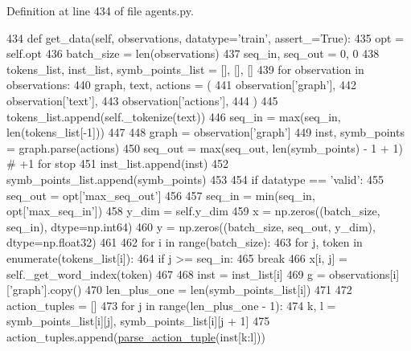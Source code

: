 Definition at line 434 of file agents.\+py.


\begin{DoxyCode}
434     \textcolor{keyword}{def }get\_data(self, observations, datatype='train', assert\_=True):
435         opt = self.opt
436         batch\_size = len(observations)
437         seq\_in, seq\_out = 0, 0
438         tokens\_list, inst\_list, symb\_points\_list = [], [], []
439         \textcolor{keywordflow}{for} observation \textcolor{keywordflow}{in} observations:
440             graph, text, actions = (
441                 observation[\textcolor{stringliteral}{'graph'}],
442                 observation[\textcolor{stringliteral}{'text'}],
443                 observation[\textcolor{stringliteral}{'actions'}],
444             )
445             tokens\_list.append(self.\_tokenize(text))
446             seq\_in = max(seq\_in, len(tokens\_list[-1]))
447 
448             graph = observation[\textcolor{stringliteral}{'graph'}]
449             inst, symb\_points = graph.parse(actions)
450             seq\_out = max(seq\_out, len(symb\_points) - 1 + 1)  \textcolor{comment}{# +1 for stop}
451             inst\_list.append(inst)
452             symb\_points\_list.append(symb\_points)
453 
454         \textcolor{keywordflow}{if} datatype == \textcolor{stringliteral}{'valid'}:
455             seq\_out = opt[\textcolor{stringliteral}{'max\_seq\_out'}]
456 
457         seq\_in = min(seq\_in, opt[\textcolor{stringliteral}{'max\_seq\_in'}])
458         y\_dim = self.y\_dim
459         x = np.zeros((batch\_size, seq\_in), dtype=np.int64)
460         y = np.zeros((batch\_size, seq\_out, y\_dim), dtype=np.float32)
461 
462         \textcolor{keywordflow}{for} i \textcolor{keywordflow}{in} range(batch\_size):
463             \textcolor{keywordflow}{for} j, token \textcolor{keywordflow}{in} enumerate(tokens\_list[i]):
464                 \textcolor{keywordflow}{if} j >= seq\_in:
465                     \textcolor{keywordflow}{break}
466                 x[i, j] = self.\_get\_word\_index(token)
467 
468             inst = inst\_list[i]
469             g = observations[i][\textcolor{stringliteral}{'graph'}].copy()
470             len\_plus\_one = len(symb\_points\_list[i])
471 
472             action\_tuples = []
473             \textcolor{keywordflow}{for} j \textcolor{keywordflow}{in} range(len\_plus\_one - 1):
474                 k, l = symb\_points\_list[i][j], symb\_points\_list[i][j + 1]
475                 action\_tuples.append(\hyperlink{namespaceprojects_1_1mastering__the__dungeon_1_1agents_1_1graph__world2_1_1agents_a11c98f469df4fb4ecb640c91544dfe26}{parse\_action\_tuple}(inst[k:l]))

\end{DoxyCode}
